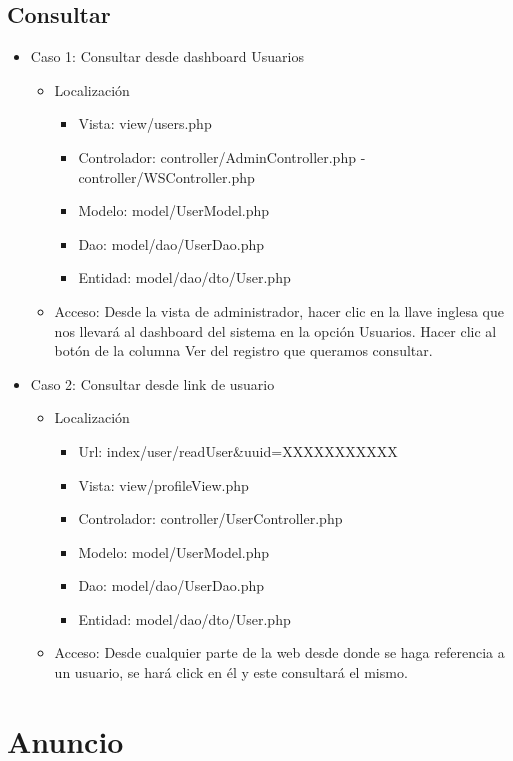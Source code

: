 \subsection{Consultar}
\begin{itemize}
\item Caso 1: Consultar desde dashboard Usuarios
\begin{itemize}
\item Localizaci\'{o}n
\begin{itemize}
\item Vista: view/users.php
\item Controlador: controller/AdminController.php - controller/WSController.php
\item Modelo: model/UserModel.php
\item Dao: model/dao/UserDao.php
\item Entidad: model/dao/dto/User.php
\end{itemize}
\item Acceso: Desde la vista de administrador, hacer clic en la llave inglesa que nos llevar\'{a} al dashboard del sistema en la opci\'{o}n Usuarios. Hacer clic al bot\'{o}n de la columna Ver del registro que queramos consultar.
\end{itemize}
\item Caso 2: Consultar desde link de usuario
\begin{itemize}
\item Localizaci\'{o}n
\begin{itemize}
\item Url: index/user/readUser\&uuid=XXXXXXXXXXX
\item Vista: view/profileView.php
\item Controlador: controller/UserController.php
\item Modelo: model/UserModel.php
\item Dao: model/dao/UserDao.php
\item Entidad: model/dao/dto/User.php
\end{itemize}
\item Acceso: Desde cualquier parte de la web desde donde se haga referencia a un usuario, se har\'{a} click en \'{e}l y este consultar\'{a} el mismo.
\end{itemize}
\end{itemize}

\section{Anuncio}
